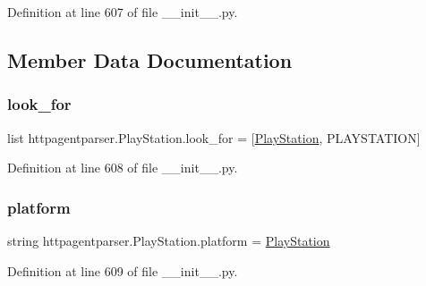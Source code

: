 Definition at line 607 of file \+\_\+\+\_\+init\+\_\+\+\_\+.\+py.



\subsection{Member Data Documentation}
\hypertarget{classhttpagentparser_1_1_play_station_a9bed93563ec0e1ca015ce455feaa36f9}{}\label{classhttpagentparser_1_1_play_station_a9bed93563ec0e1ca015ce455feaa36f9} 
\subsubsection{\texorpdfstring{look\+\_\+for}{look\_for}}
{\footnotesize\ttfamily list httpagentparser.\+Play\+Station.\+look\+\_\+for = \mbox{[}\textquotesingle{}\hyperlink{classhttpagentparser_1_1_play_station}{Play\+Station}\textquotesingle{}, \textquotesingle{}P\+L\+A\+Y\+S\+T\+A\+T\+I\+ON\textquotesingle{}\mbox{]}\hspace{0.3cm}{\ttfamily [static]}}



Definition at line 608 of file \+\_\+\+\_\+init\+\_\+\+\_\+.\+py.

\hypertarget{classhttpagentparser_1_1_play_station_a104399d4c58b0e4d1ea73571a5e5de61}{}\label{classhttpagentparser_1_1_play_station_a104399d4c58b0e4d1ea73571a5e5de61} 
\subsubsection{\texorpdfstring{platform}{platform}}
{\footnotesize\ttfamily string httpagentparser.\+Play\+Station.\+platform = \textquotesingle{}\hyperlink{classhttpagentparser_1_1_play_station}{Play\+Station}\textquotesingle{}\hspace{0.3cm}{\ttfamily [static]}}



Definition at line 609 of file \+\_\+\+\_\+init\+\_\+\+\_\+.\+py.

\hypertarget{classhttpagentparser_1_1_play_station_a2c0c6a41410099bf643997f46605d4d8}{}\label{classhttpagentparser_1_1_play_station_a2c0c6a41410099bf643997f46605d4d8} 
